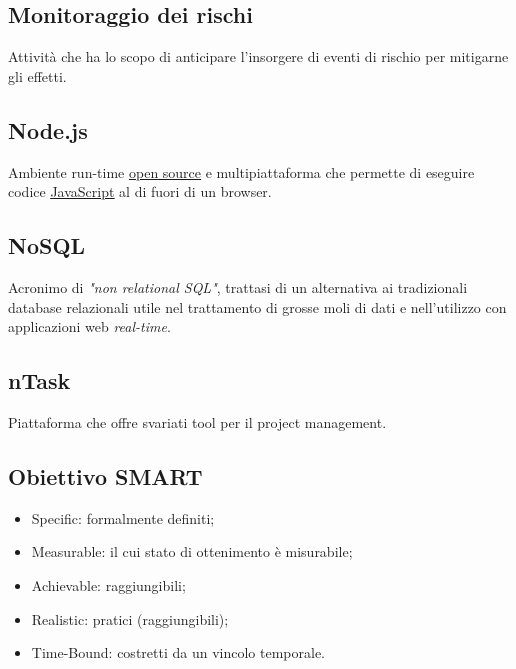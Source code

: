 	\subsection{Monitoraggio dei rischi}
	\label{sec:monitoraggiorischi}
	Attività che ha lo scopo di anticipare l'insorgere di eventi di rischio per mitigarne gli effetti.	
	
\newpage

	\subsection{Node.js}
	\label{sec:nodejs}
	Ambiente run-time \underline{\hyperref[sec:opensource]{open source}} e multipiattaforma che permette di eseguire codice \underline{\hyperref[sec:javascript]{JavaScript}} al di fuori di un browser.

	\subsection{NoSQL}
	\label{sec:nosql}
	Acronimo di \emph{"non relational SQL"}, trattasi di un alternativa ai tradizionali database relazionali utile nel trattamento di grosse moli di dati e nell'utilizzo con applicazioni web \emph{real-time}.
	\newpage

	\subsection{nTask}
	\label{sec:ntask}	
	Piattaforma che offre svariati tool per il project management.


	\subsection{Obiettivo SMART}
	\label{sec:smart}
	\begin{itemize}
			\item Specific: formalmente definiti;
			\item Measurable: il cui stato di ottenimento è misurabile;
			\item Achievable: raggiungibili;
			\item Realistic: pratici (raggiungibili);
			\item Time-Bound: costretti da un vincolo temporale.
		\end{itemize}

